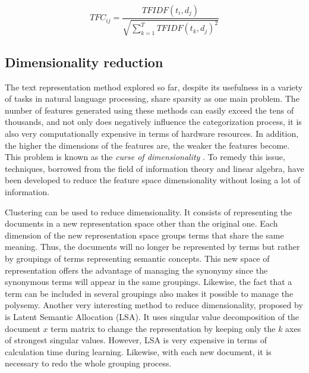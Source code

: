 $$T F C _ { i j } = \frac { T F I D F \left( t _ { i } , d _ { j } \right) } { \sqrt { \sum _ { k = 1 } ^ { T } T F I D F \left( t _ { k } , d _ { j } \right) ^ { 2 } } }$$

\subsection{Dimensionality reduction}

The text representation method explored so far, despite its usefulness in a variety of tasks in natural language processing, share sparsity as one main problem. The number of features generated using these methods can easily exceed the tens of thousands, and not only does negatively influence the categorization process, it is also very computationally expensive in terms of hardware resources. In addition, the higher the dimensions of the features are, the weaker the features become. This problem is known as the \emph{curse of dimensionality} \citep{bellman2015adaptive}. To remedy this issue,  techniques, borrowed from the field of information theory and linear algebra, have been developed to reduce the feature space dimensionality without losing a lot of information. 


Clustering \citep{baker1998distributional} \citep{sable2001using} \citep{slonim2001power} can be used to reduce dimensionality. It consists of representing the documents in a new representation space other than the original one. Each dimension of the new representation space groups terms that share the same meaning. Thus, the documents will no longer be represented by terms but rather by groupings of terms representing semantic concepts. This new space of representation offers the advantage of managing the synonymy since the synonymous terms will appear in the same groupings. Likewise, the fact that a term can be included in several groupings also makes it possible to manage the polysemy. Another very interesting method to reduce dimensionality, proposed by \cite{deerwester1990indexing} is Latent Semantic Allocation (LSA). It uses singular value decomposition of the document $x$ term matrix to change the representation by keeping only the $k$ axes of strongest singular values. However, LSA is very expensive in terms of calculation time during learning. Likewise, with each new document, it is necessary to redo the whole grouping process.

